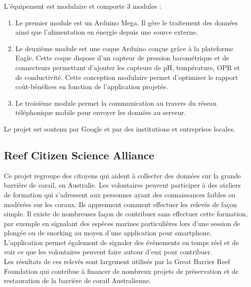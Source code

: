 \documentclass[10pt, article]{llncs}
\begin{document}
		L'équipement est modulaire et comporte 3 modules :\\
		\begin{enumerate}
			\item Le premier module est un Arduino Mega. Il gère le traitement des données ainsi que l'alimentation en énergie depuis une source externe.
			\item Le deuxième module est une coque Arduino conçue grâce à la plateforme Eagle. Cette coque dispose d'un capteur de pression barométrique et de connecteurs permettant d'ajouter les capteurs de pH, température, OPR et de conductivité. Cette conception modulaire permet d'optimiser le rapport coût-bénéfices en fonction de l'application projetée.
			\item Le troisième module permet la communication au travers du réseau téléphonique mobile pour envoyer les données au serveur.
		\end{enumerate}
		Le projet est soutenu par Google et par des institutions et entreprises locales.

	\subsection{Reef Citizen Science Alliance}
		Ce projet regroupe des citoyens qui aident à collecter des données sur la grande barrière de corail, en Australie. Les volontaires peuvent participer à des ateliers de formation qui s'adressent aux personnes ayant des connaissances faibles ou modérées sur les coraux. Ils apprennent comment effectuer les relevés de façon simple. Il existe de nombreuses façon de contribuer sans effectuer cette formation, par exemple en signalant des espèces marines particulières lors d'une session de plongée ou de snorking au moyen d'une application pour smartphone. L'application permet également de signaler des évènements en temps réel et de voir ce que les volontaires peuvent faire autour d'eux pour contribuer. \\
		Les résultats de ces relevés sont largement utilisés par la Great Barrier Reef Foundation qui contribue à financer de nombreux projets de préservation et de  restauration de la barrière de corail Australienne.
	
\end{document}
